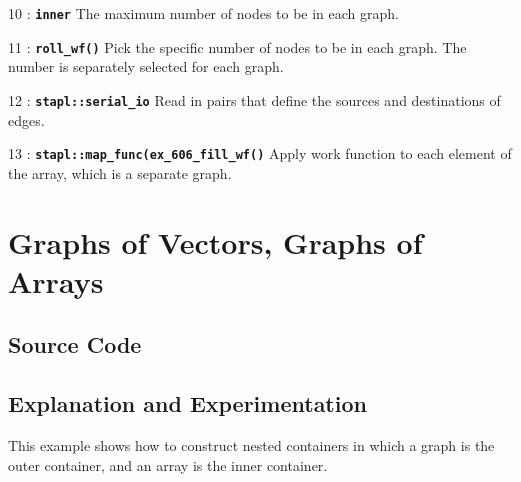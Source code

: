 \documentclass{report}
\begin{document}
\begin{hashitemize}
\item 10 : \texttt{{\bf inner}}
\newline
The maximum number of nodes to be in each graph.

\item 11 : \texttt{{\bf roll\_wf()}}
\newline
Pick the specific number of nodes to be in each graph.  The number is
separately selected for each graph.

\item 12 : \texttt{{\bf stapl::serial\_io}}
\newline
Read in pairs that define the sources and destinations of edges.

\item 13 : \texttt{{\bf stapl::map\_func(ex\_606\_fill\_wf()}}
\newline
Apply work function to each element of the array, which is a separate graph.

\end{hashitemize}



\pagebreak
\section{Graphs of Vectors, Graphs of Arrays}

\subsection{Source Code}



\subsection{Explanation and Experimentation}

This example shows how to construct nested containers in which
a graph is the outer container, and an array is the inner container.
\end{document}
